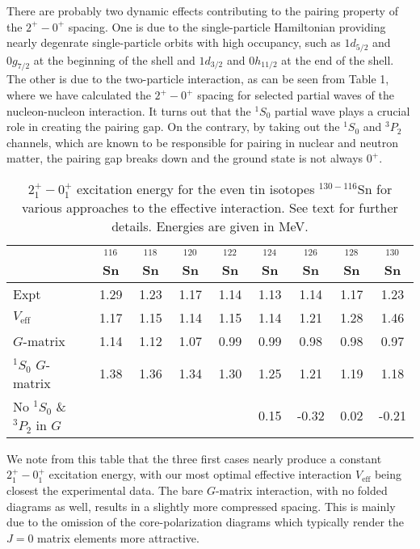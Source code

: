 \documentclass{ws-p8-50x6-00}
\begin{document}
There are probably two dynamic effects contributing to the 
pairing property of the $2^+ - 0^+$ spacing. One is due to the single-particle 
Hamiltonian providing nearly degenrate single-particle orbits 
with high occupancy, such as $1d_{5/2}$ and  $0g_{7/2}$ at the beginning 
of the shell and $1d_{3/2}$ and $0h_{11/2}$ at the end of the shell. 
The other is due to the two-particle interaction, as can be seen 
from Table 1, where we have calculated the $2^+ - 0^+$ spacing 
for selected partial waves of the nucleon-nucleon interaction. 
It turns out that the $^1S_0$ partial wave plays a crucial role in 
creating the pairing gap. On the contrary, by taking out 
the $^1S_0$ and $^3P_2$ channels, which are known to be responsible for 
pairing in nuclear and neutron matter, 
the pairing gap breaks down and the ground state is not always $0^+$.
\begin{table}[hbt]
\begin{center}
\caption{ $2^+_1-0^+_1$ excitation energy for the 
even tin isotopes $^{130-116}$Sn for various approaches
to the effective interaction. See text for further details. 
Energies are given in MeV. }\footnotesize
\begin{tabular}{lcccccccc}\hline
 & {$^{116}$Sn} & {$^{118}$Sn} & {$^{120}$Sn} &{$^{122}$Sn} & {$^{124}$Sn} & {$^{126}$Sn} & {$^{128}$Sn} & {$^{130}$Sn} \\ \hline
Expt & 1.29 & 1.23 & 1.17 & 1.14 & 1.13 & 1.14 & 1.17 & 1.23 \\
$V_{\mathrm{eff}}$ & 1.17 & 1.15 & 1.14 & 1.15 & 1.14 & 1.21 & 1.28 & 1.46 \\
$G$-matrix &1.14 & 1.12& 1.07 & 0.99 & 0.99 & 0.98 & 0.98 & 0.97  \\
$^1S_0$ $G$-matrix &1.38 &1.36 &1.34 &1.30 & 1.25& 1.21 &1.19 &1.18 \\
No $^1S_0$ \& $^3P_2$ in $G$ &     &     &     &      &0.15 &-0.32 &0.02 &-0.21  \\\hline
\end{tabular}
\end{center}
\label{tab:table1}
\end{table}
We note from this table that the three first cases nearly produce a constant 
$2^+_1-0^+_1$ excitation energy, with our most optimal effective interaction
$V_{\mathrm{eff}}$ being closest the experimental data. The bare $G$-matrix
interaction, with no folded diagrams as well, results in a slightly more compressed
spacing. This is mainly due to the omission of the core-polarization 
diagrams which typically render the $J=0$ matrix elements more attractive.
\end{document}
